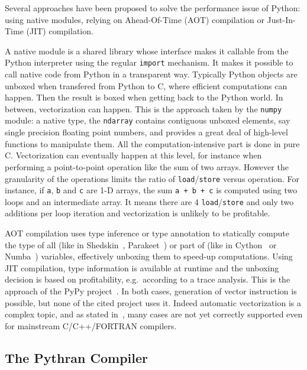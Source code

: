 \documentclass[10pt]{sigplanconf}
\begin{document}
Several approaches have been proposed to solve the performance issue of Python:
using native modules, relying on Ahead-Of-Time (AOT) compilation or
Just-In-Time (JIT) compilation.

A native module is a shared library whose interface makes it callable from the
Python interpreter using the regular \texttt{import} mechanism. It makes it
possible to call native code from Python in a transparent way. Typically Python
objects are unboxed when transfered from Python to C, where efficient
computations can happen. Then the result is boxed when getting back to the
Python world. In between, vectorization can happen. This is the approach taken
by the \texttt{numpy} module: a native type, the \texttt{ndarray} contains
contiguous unboxed elements, say single precision floating point numbers, and
provides a great deal of high-level functions to manipulate them. All the
computation-intensive part is done in pure C.  Vectorization can eventually
happen at this level, for instance when performing a point-to-point operation
like the sum of two arrays. However the granularity of the operations limits
the ratio of \texttt{load}/\texttt{store} versus operation. For instance, if
\texttt{a}, \texttt{b} and \texttt{c} are 1-D arrays, the sum \texttt{a + b +
c} is computed using two loops and an intermediate array. It means there are 4
\texttt{load}/\texttt{store} and only two additions per loop iteration and vectorization is
unlikely to be profitable.

AOT compilation uses type inference or type annotation to statically compute
the type of all (like in Shedskin~\cite{shedskin2006},
Parakeet~\cite{parakeet2012}) or part of (like in Cython~\cite{cython2010} or
Numba~\cite{numba}) variables, effectively unboxing them to speed-up
computations. Using JIT compilation, type information is available at runtime
and the unboxing decision is based on profitability, e.g.\ according to a trace
analysis. This is the approach of the PyPy project~\cite{pypy2009}. In both
cases, generation of vector instruction is possible, but none of the cited
project uses it. Indeed automatic vectorization is a complex topic, and as
stated in~\cite{maleki2011}, many cases are not yet correctly supported even
for mainstream C/C++/FORTRAN compilers.

\subsection{The Pythran Compiler}
\end{document}
